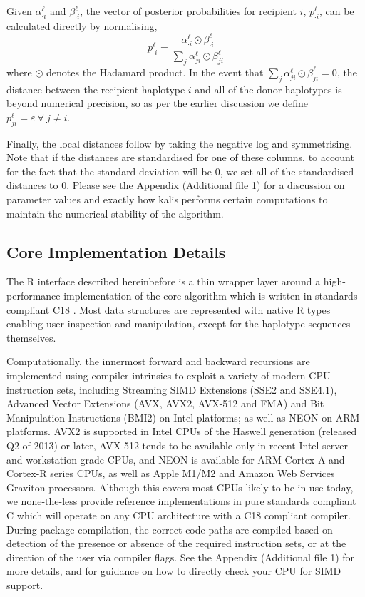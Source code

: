 \documentclass[pdflatex,referee,lineno,sn-nature]{sn-jnl}%
\let\proglang=\textsf
\newcommand{\pkg}[1]{{\fontseries{m}\fontseries{b}\selectfont #1}}
\begin{document}
Given \(\alpha_{\cdot i}^\ell\) and \(\beta_{\cdot i}^\ell\), the vector of posterior probabilities for recipient \(i\), \(p^\ell_{\cdot i}\), can be calculated directly by normalising,
\begin{equation}
	p^\ell_{\cdot i} = \frac{\alpha^\ell_{\cdot i} \odot \beta^\ell_{\cdot i}}{\sum\limits_j \alpha^\ell_{ji} \odot \beta^\ell_{ji}} \label{eq:postprob}
\end{equation}
where \(\odot\) denotes the Hadamard product.
In the event that \(\sum\limits_j \alpha^\ell_{ji} \odot \beta^\ell_{ji} = 0\), the distance between the recipient haplotype \(i\) and all of the donor haplotypes is beyond numerical precision, so as per the earlier discussion we define \(p_{ji}^\ell = \varepsilon \ \forall\ j \ne i\).

Finally, the local distances follow by taking the negative log and symmetrising.
Note that if the distances are standardised for one of these columns, to account for the fact that the standard deviation will be 0, we set all of the standardised distances to 0.
Please see the Appendix (Additional file 1) for a discussion on parameter values and exactly how \pkg{kalis} performs certain computations to maintain the numerical stability of the algorithm.



\subsection*{Core Implementation Details}
\label{sec:core}

The \proglang{R} interface described hereinbefore is a thin wrapper layer around a high-performance implementation of the core algorithm which is written in standards compliant C18 \cite{C18}.
Most data structures are represented with native \proglang{R} types enabling user inspection and manipulation, except for the haplotype sequences themselves.

Computationally, the innermost forward and backward recursions are implemented using compiler intrinsics to exploit a variety of modern CPU instruction sets, including Streaming SIMD Extensions (SSE2 and SSE4.1), Advanced Vector Extensions (AVX, AVX2, AVX-512 and FMA) and Bit Manipulation Instructions (BMI2) on Intel platforms; as well as NEON on ARM platforms.
AVX2 is supported in Intel CPUs of the Haswell generation (released Q2 of 2013) or later, AVX-512 tends to be available only in recent Intel server and workstation grade CPUs, and NEON is available for ARM Cortex-A and Cortex-R series CPUs, as well as Apple M1/M2 and Amazon Web Services Graviton processors.
Although this covers most CPUs likely to be in use today, we none-the-less provide reference implementations in pure standards compliant \proglang{C} which will operate on any CPU architecture with a C18 compliant compiler.
During package compilation, the correct code-paths are compiled based on detection of the presence or absence of the required instruction sets, or at the direction of the user via compiler flags.
See the Appendix (Additional file 1) for more details, and for guidance on how to directly check your CPU for SIMD support.
\end{document}
